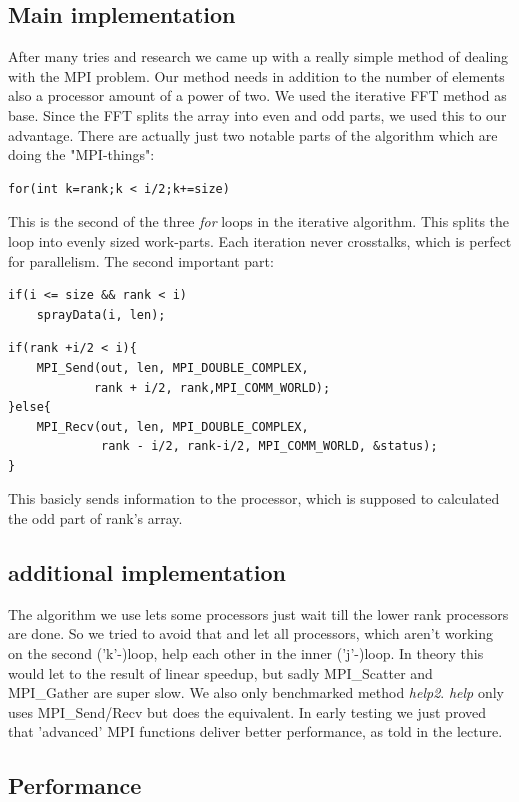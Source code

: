 \subsection{Main implementation}
After many tries and research we came up with a really simple method of dealing with the MPI problem. Our method needs in addition to the number of elements also a processor amount of a power of two. We used the iterative FFT method as base. Since the FFT splits the array into even and odd parts, we used this to our advantage. There are actually just two notable parts of the algorithm which are doing the "MPI-things":
\begin{lstlisting}
for(int k=rank;k < i/2;k+=size)
\end{lstlisting}
This is the second of the three \textit{for} loops in the iterative algorithm. This splits the loop into evenly sized work-parts. Each iteration never crosstalks, which is perfect for parallelism.\newline
The second important part:
\begin{lstlisting}
if(i <= size && rank < i)
	sprayData(i, len);
\end{lstlisting}
\begin{lstlisting}
if(rank +i/2 < i){
	MPI_Send(out, len, MPI_DOUBLE_COMPLEX,
			rank + i/2, rank,MPI_COMM_WORLD);
}else{
	MPI_Recv(out, len, MPI_DOUBLE_COMPLEX,
			 rank - i/2, rank-i/2, MPI_COMM_WORLD, &status);
}
\end{lstlisting}
This basicly sends information to the processor, which is supposed to calculated the odd part of rank's array. 
\subsection{additional implementation}

The algorithm we use lets some processors just wait till the lower rank processors are done. So we tried to avoid that and let all processors, which aren't working on the second ('k'-)loop, help each other in the inner ('j'-)loop. In theory this would let to the result of linear speedup, but sadly MPI\_Scatter and MPI\_Gather are super slow. We also only benchmarked method \textit{help2}. \textit{help} only uses MPI\_Send/Recv but does the equivalent. In early testing we just proved that 'advanced' MPI functions deliver better performance, as told in the lecture.

\subsection{Performance}


